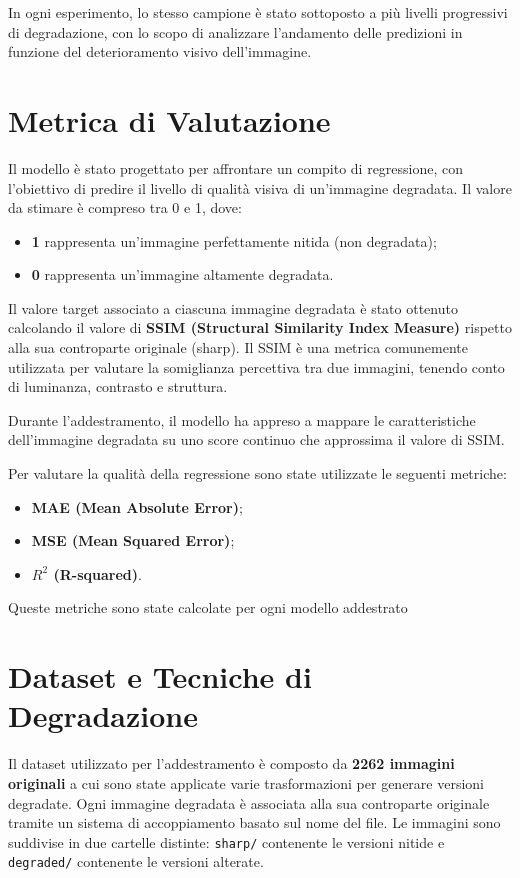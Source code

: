 In ogni esperimento, lo stesso campione è stato sottoposto a più livelli progressivi di degradazione, con lo scopo di analizzare l'andamento delle predizioni in funzione del deterioramento visivo dell'immagine.
\section{Metrica di Valutazione}

Il modello è stato progettato per affrontare un compito di regressione, con l'obiettivo di predire il livello di qualità visiva di un'immagine degradata. Il valore da stimare è compreso tra 0 e 1, dove:
\begin{itemize}
    \item \textbf{1} rappresenta un'immagine perfettamente nitida (non degradata);
    \item \textbf{0} rappresenta un'immagine altamente degradata.
\end{itemize}

Il valore target associato a ciascuna immagine degradata è stato ottenuto calcolando il valore di \textbf{SSIM (Structural Similarity Index Measure)} rispetto alla sua controparte originale (sharp). Il SSIM è una metrica comunemente utilizzata per valutare la somiglianza percettiva tra due immagini, tenendo conto di luminanza, contrasto e struttura.

Durante l'addestramento, il modello ha appreso a mappare le caratteristiche dell'immagine degradata su uno score continuo che approssima il valore di SSIM.

Per valutare la qualità della regressione sono state utilizzate le seguenti metriche:
\begin{itemize}
    \item \textbf{MAE (Mean Absolute Error)};
    \item \textbf{MSE (Mean Squared Error)};
    \item \textbf{$R^2$ (R-squared)}.
\end{itemize}

Queste metriche sono state calcolate per ogni modello addestrato
\section{Dataset e Tecniche di Degradazione}

Il dataset utilizzato per l’addestramento è composto da \textbf{2262 immagini originali} a cui sono state applicate varie trasformazioni per generare versioni degradate. Ogni immagine degradata è associata alla sua controparte originale tramite un sistema di accoppiamento basato sul nome del file. Le immagini sono suddivise in due cartelle distinte: \texttt{sharp/} contenente le versioni nitide e \texttt{degraded/} contenente le versioni alterate.

